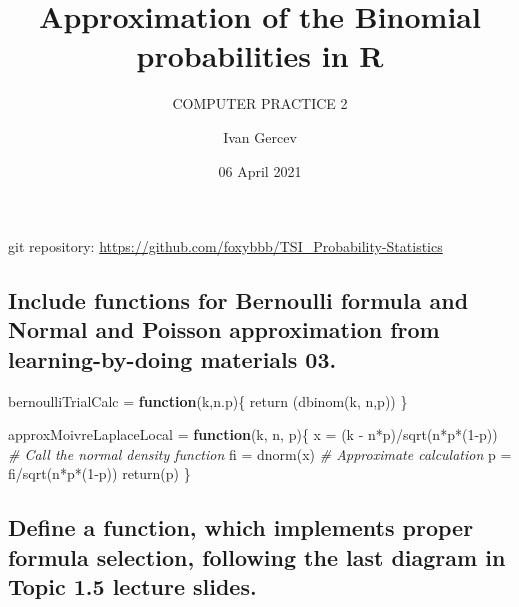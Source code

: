\documentclass[
]{article}
\title{Approximation of the Binomial probabilities in R}
\subtitle{COMPUTER PRACTICE 2}
\author{Ivan Gercev}
\date{06 April 2021}
\newenvironment{Shaded}{\begin{snugshade}}{\end{snugshade}}
\newcommand{\CommentTok}[1]{\textcolor[rgb]{0.56,0.35,0.01}{\textit{#1}}}
\newcommand{\ControlFlowTok}[1]{\textcolor[rgb]{0.13,0.29,0.53}{\textbf{#1}}}
\newcommand{\DecValTok}[1]{\textcolor[rgb]{0.00,0.00,0.81}{#1}}
\newcommand{\FunctionTok}[1]{\textcolor[rgb]{0.00,0.00,0.00}{#1}}
\newcommand{\NormalTok}[1]{#1}
\newcommand{\OtherTok}[1]{\textcolor[rgb]{0.56,0.35,0.01}{#1}}
\newcommand{\SpecialCharTok}[1]{\textcolor[rgb]{0.00,0.00,0.00}{#1}}
\begin{document}
\maketitle

git repository:
\url{https://github.com/foxybbb/TSI_Probability-Statistics}

\hypertarget{include-functions-for-bernoulli-formula-and-normal-and-poisson-approximation-from-learning-by-doing-materials-03.}{%
\subsection{Include functions for Bernoulli formula and Normal and
Poisson approximation from learning-by-doing materials
03.}\label{include-functions-for-bernoulli-formula-and-normal-and-poisson-approximation-from-learning-by-doing-materials-03.}}

\begin{Shaded}
\begin{Highlighting}[]
\NormalTok{bernoulliTrialCalc }\OtherTok{=} \ControlFlowTok{function}\NormalTok{(k,n.p)\{}
\FunctionTok{return}\NormalTok{ (}\FunctionTok{dbinom}\NormalTok{(k, n,p))}
\NormalTok{\}}
\end{Highlighting}
\end{Shaded}

\begin{Shaded}
\begin{Highlighting}[]
\NormalTok{approxMoivreLaplaceLocal }\OtherTok{=} \ControlFlowTok{function}\NormalTok{(k, n, p)\{}
\NormalTok{    x }\OtherTok{=}\NormalTok{ (k }\SpecialCharTok{{-}}\NormalTok{ n}\SpecialCharTok{*}\NormalTok{p)}\SpecialCharTok{/}\FunctionTok{sqrt}\NormalTok{(n}\SpecialCharTok{*}\NormalTok{p}\SpecialCharTok{*}\NormalTok{(}\DecValTok{1}\SpecialCharTok{{-}}\NormalTok{p))}
    \CommentTok{\# Call the normal density function}
\NormalTok{  fi }\OtherTok{=} \FunctionTok{dnorm}\NormalTok{(x)}
    \CommentTok{\# Approximate calculation}
\NormalTok{    p }\OtherTok{=}\NormalTok{ fi}\SpecialCharTok{/}\FunctionTok{sqrt}\NormalTok{(n}\SpecialCharTok{*}\NormalTok{p}\SpecialCharTok{*}\NormalTok{(}\DecValTok{1}\SpecialCharTok{{-}}\NormalTok{p))}
    \FunctionTok{return}\NormalTok{(p)}
\NormalTok{\}}
\end{Highlighting}
\end{Shaded}

\hypertarget{define-a-function-which-implements-proper-formula-selection-following-the-last-diagram-in-topic-1.5-lecture-slides.}{%
\subsection{Define a function, which implements proper formula
selection, following the last diagram in Topic 1.5 lecture
slides.}\label{define-a-function-which-implements-proper-formula-selection-following-the-last-diagram-in-topic-1.5-lecture-slides.}}
\end{document}
